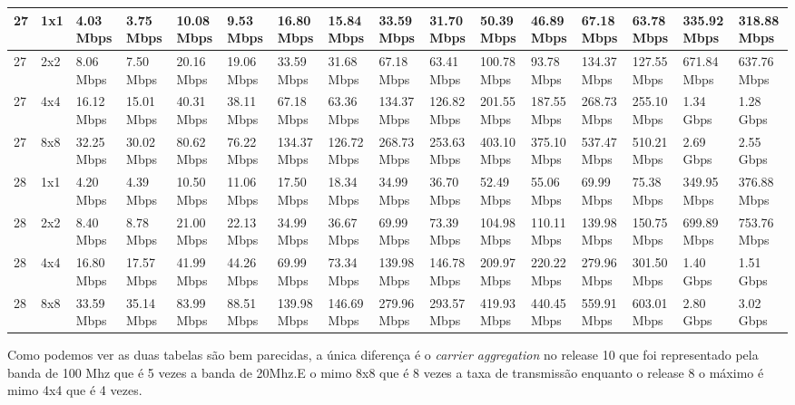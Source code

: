\documentclass[12pt]{article}
\begin{document}
\begin{longtable}[c]{|l|l|l|l|l|l|l|l|l|l|l|l|l|l|l|l|}
27 & 1x1 & 4.03 Mbps & 3.75 Mbps & 10.08 Mbps & 9.53 Mbps & 16.80 Mbps & 15.84 Mbps & 33.59 Mbps & 31.70 Mbps & 50.39 Mbps & 46.89 Mbps & 67.18 Mbps & 63.78 Mbps & 335.92 Mbps & 318.88 Mbps \\ \hline
27 & 2x2 & 8.06 Mbps & 7.50 Mbps & 20.16 Mbps & 19.06 Mbps & 33.59 Mbps & 31.68 Mbps & 67.18 Mbps & 63.41 Mbps & 100.78 Mbps & 93.78 Mbps & 134.37 Mbps & 127.55 Mbps & 671.84 Mbps & 637.76 Mbps \\ \hline
27 & 4x4 & 16.12 Mbps & 15.01 Mbps & 40.31 Mbps & 38.11 Mbps & 67.18 Mbps & 63.36 Mbps & 134.37 Mbps & 126.82 Mbps & 201.55 Mbps & 187.55 Mbps & 268.73 Mbps & 255.10 Mbps & 1.34 Gbps & 1.28 Gbps \\ \hline
27 & 8x8 & 32.25 Mbps & 30.02 Mbps & 80.62 Mbps & 76.22 Mbps & 134.37 Mbps & 126.72 Mbps & 268.73 Mbps & 253.63 Mbps & 403.10 Mbps & 375.10 Mbps & 537.47 Mbps & 510.21 Mbps & 2.69 Gbps & 2.55 Gbps \\ \hline
28 & 1x1 & 4.20 Mbps & 4.39 Mbps & 10.50 Mbps & 11.06 Mbps & 17.50 Mbps & 18.34 Mbps & 34.99 Mbps & 36.70 Mbps & 52.49 Mbps & 55.06 Mbps & 69.99 Mbps & 75.38 Mbps & 349.95 Mbps & 376.88 Mbps \\ \hline
28 & 2x2 & 8.40 Mbps & 8.78 Mbps & 21.00 Mbps & 22.13 Mbps & 34.99 Mbps & 36.67 Mbps & 69.99 Mbps & 73.39 Mbps & 104.98 Mbps & 110.11 Mbps & 139.98 Mbps & 150.75 Mbps & 699.89 Mbps & 753.76 Mbps \\ \hline
28 & 4x4 & 16.80 Mbps & 17.57 Mbps & 41.99 Mbps & 44.26 Mbps & 69.99 Mbps & 73.34 Mbps & 139.98 Mbps & 146.78 Mbps & 209.97 Mbps & 220.22 Mbps & 279.96 Mbps & 301.50 Mbps & 1.40 Gbps & 1.51 Gbps \\ \hline
28 & 8x8 & 33.59 Mbps & 35.14 Mbps & 83.99 Mbps & 88.51 Mbps & 139.98 Mbps & 146.69 Mbps & 279.96 Mbps & 293.57 Mbps & 419.93 Mbps & 440.45 Mbps & 559.91 Mbps & 603.01 Mbps & 2.80 Gbps & 3.02 Gbps \\ \hline
\end{longtable}
\normalsize
Como podemos ver as duas tabelas são bem parecidas, a única diferença é o \textit{carrier aggregation} no release 10 que foi representado pela banda de 100 Mhz que é 5 vezes a banda de 20Mhz.E o mimo 8x8 que é 8 vezes a taxa de transmissão enquanto o release 8 o máximo é mimo 4x4 que é 4 vezes. 
\end{document}
